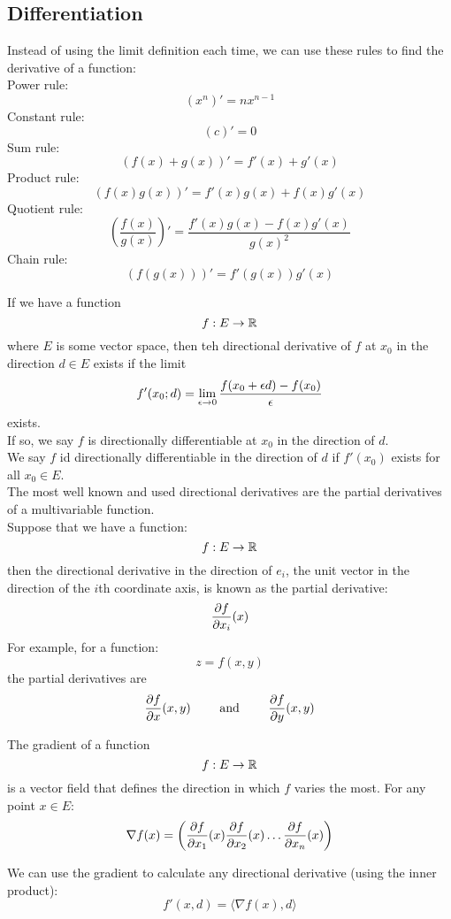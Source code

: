\documentclass[12pt]{article}
\begin{document}
    \newpage

    \subsection*{Differentiation}

    Instead of using the limit definition each time,
    we can use these rules to find the derivative
    of a function: \\
    Power rule: \[ (x^n)' = nx^{n-1} \]
    Constant rule: \[ (c)' = 0  \]
    Sum rule: \[ (f(x) + g(x))' = f'(x) + g'(x) \]
    Product rule: \[ (f(x)g(x))' = f'(x)g(x) + f(x)g'(x) \]
    Quotient rule: \[ \left(\dfrac{f(x)}{g(x)}\right)' =
    \dfrac{f'(x)g(x) - f(x)g'(x)}{g(x)^2} \]
    Chain rule: \[ (f(g(x)))' = f'(g(x))g'(x) \]

    If we have a function
    \[ f: E \to \mathbb{R} \]
    where $E$ is some vector space,
    then teh directional derivative of $f$
    at $x_0$ in the direction $d \in E$
    exists if the limit
    \[ f'(x_0; d) = \lim_{\epsilon \to 0} 
        \dfrac{f(x_0+\epsilon d) - f(x_0)}{\epsilon}
   \]
    exists. \\
    If so, we say $f$ is directionally differentiable
    at $x_0$ in the direction of $d$. \\
    We say $f$ id directionally differentiable
    in the direction of $d$
    if $f'(x_0)$ exists for all $x_0 \in E$. \\

    The most well known and used directional
    derivatives are the partial derivatives of a
    multivariable function. \\
    Suppose that we have a function:
    \[ f: E \to \mathbb{R} \]
    then the directional derivative in the direction 
    of $e_i$,
    the unit vector in the direction of the $i$th
    coordinate axis,
    is known as the partial derivative:
    \[ \dfrac{\partial f}{\partial x_i}(x)\]
    For example, for a function:
    \[ z = f(x, y) \]
    the partial derivatives are
    \[ \dfrac{\partial f}{\partial x}(x, y) \qquad \text{ and } 
    \qquad \dfrac{\partial f}{\partial y}(x, y) \]

    The gradient of a function
    \[ f: E \to \mathbb{R} \]
    is a vector field
    that defines the direction in which
    $f$ varies the most.
    For any point $x \in E$:
    \[ \nabla f(x) =
    \left( \dfrac{\partial f}{\partial x_1}(x)
    \dfrac{\partial f}{\partial x_2}(x) 
    \dots \dfrac{\partial f}{\partial x_n}(x) \right) \]

    We can use the gradient to calculate any
    directional derivative (using the inner product):
    \[ f'(x, d) = \langle \nabla f(x), d \rangle \]
\end{document}
